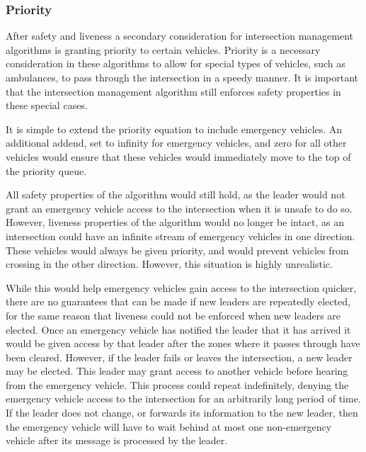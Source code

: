 \documentclass[12pt]{article}
\begin{document}
\subsubsection{Priority}
After safety and liveness a secondary consideration for intersection management algorithms is granting priority to certain vehicles. Priority is a necessary consideration in these algorithms to allow for special types of vehicles, such as ambulances, to pass through the intersection in a speedy manner. It is important that the intersection management algorithm still enforces safety properties in these special cases.\par
It is simple to extend the priority equation to include emergency vehicles. An additional addend, set to infinity for emergency vehicles, and zero for all other vehicles would ensure that these vehicles would immediately move to the top of the priority queue.\par
 All safety properties of the algorithm would still hold, as the leader would not grant an emergency vehicle access to the intersection when it is unsafe to do so. However, liveness properties of the algorithm would no longer be intact, as an intersection could have an infinite stream of emergency vehicles in one direction. These vehicles would always be given priority, and would prevent vehicles from crossing in the other direction. However, this situation is highly unrealistic. \par
While this would help emergency vehicles gain access to the intersection quicker, there are no guarantees that can be made if new leaders are repeatedly elected, for the same reason that liveness could not be enforced when new leaders are elected. Once an emergency vehicle has notified the leader that it has arrived it would be given access by that leader after the zones where it passes through have been cleared. However, if the leader fails or leaves the intersection, a new leader may be elected. This leader may grant access to another vehicle before hearing from the emergency vehicle. This process could repeat indefinitely, denying the emergency vehicle access to the intersection for an arbitrarily long period of time. If the leader does not change, or forwards its information to the new leader, then the emergency vehicle will have to wait behind at most one non-emergency vehicle after its message is processed by the leader.\par
\end{document}
